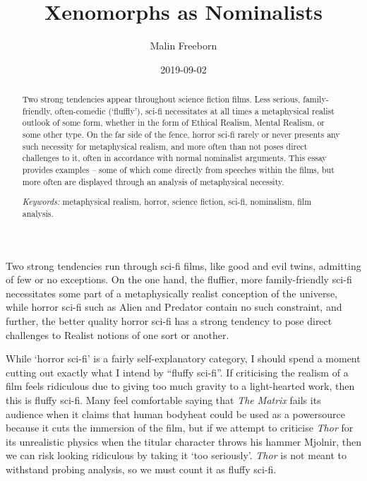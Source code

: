 \documentclass{article}
\title{Xenomorphs as Nominalists}
\author{Malin Freeborn}
\date{2019-09-02}
\begin{document}
\maketitle

\tableofcontents

\begin{abstract}

Two strong tendencies appear throughout science fiction films. Less serious, family-friendly, often-comedic (`fluffly'), sci-fi necessitates at all times a metaphysical realist outlook of some form, whether in the form of Ethical Realism, Mental Realism, or some other type. On the far side of the fence, horror sci-fi rarely or never presents any such necessity for metaphysical realism, and more often than not poses direct challenges to it, often in accordance with normal nominalist arguments. This essay provides examples -- some of which come directly from speeches within the films, but more often are displayed through an analysis of metaphysical necessity.  

	\textit{Keywords:} metaphysical realism, horror, science fiction, sci-fi, nominalism, film analysis.

\end{abstract}

\pagebreak

Two strong tendencies run through sci-fi films, like good and evil twins, admitting of few or no exceptions. On the one hand, the fluffier, more family-friendly sci-fi necessitates some part of a metaphysically realist conception of the universe, while horror sci-fi such as Alien and Predator contain no such constraint, and further, the better quality horror sci-fi has a strong tendency to pose direct challenges to Realist notions of one sort or another.

While `horror sci-fi' is a fairly self-explanatory category, I should spend a moment cutting out exactly what I intend by ``fluffy sci-fi''. If criticising the realism of a film feels ridiculous due to giving too much gravity to a light-hearted work, then this is fluffy sci-fi. Many feel comfortable saying that \textit{The Matrix} fails its audience when it claims that human bodyheat could be used as a powersource because it cuts the immersion of the film, but if we attempt to criticise \textit{Thor} for its unrealistic physics when the titular character throws his hammer Mjolnir, then we can risk looking ridiculous by taking it `too seriously'. \textit{Thor} is not meant to withstand probing analysis, so we must count it as fluffy sci-fi.  
\end{document}
